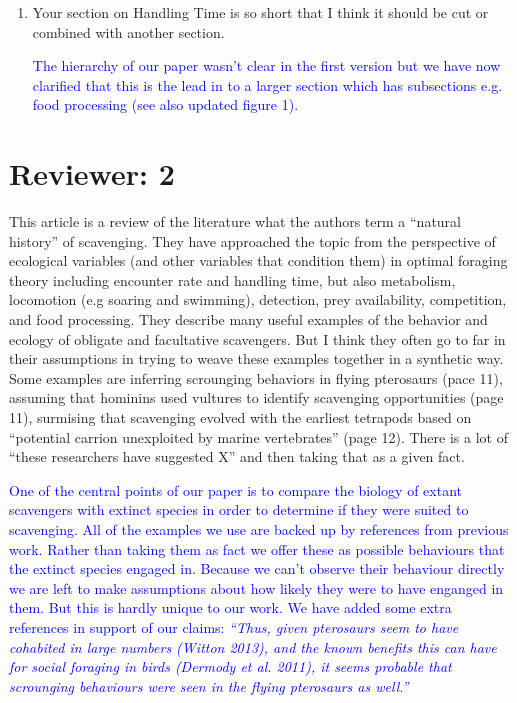 \documentclass[12pt,letterpaper]{article}
\begin{document}
\begin{enumerate}
\item{Your section on Handling Time is so short that I think it should be cut or combined with another section.}

\textcolor{blue}{The hierarchy of our paper wasn't clear in the first version but we have now clarified that this is the lead in to a larger section which has subsections e.g. food processing (see also updated figure 1).} 

\end{enumerate}

\section{Reviewer: 2}
This article is a review of the literature what the authors term a ``natural history'' of scavenging.
They have approached the topic from the perspective of ecological variables (and other variables that condition them) in optimal foraging theory including encounter rate and handling time, but also metabolism, locomotion (e.g soaring and swimming), detection, prey availability, competition, and food processing.
They describe many useful examples of the behavior and ecology of obligate and facultative scavengers.
But I think they often go to far in their assumptions in trying to weave these examples together in a synthetic way.
Some examples are inferring scrounging behaviors in flying pterosaurs (pace 11), assuming that hominins used vultures to identify scavenging opportunities (page 11), surmising that scavenging evolved with the earliest tetrapods based on ``potential carrion unexploited by marine vertebrates'' (page 12).
There is a lot of ``these researchers have suggested X'' and then taking that as a given fact.

\smallskip
\textcolor{blue}{One of the central points of our paper is to compare the biology of extant scavengers with extinct species in order to determine if they were suited to scavenging.
All of the examples we use are backed up by references from previous work.
Rather than taking them as fact we offer these as possible behaviours that the extinct species engaged in.
Because we can't observe their behaviour directly we are left to make assumptions about how likely they were to have enganged in them.
But this is hardly unique to our work.
We have added some extra references in support of our claims: \textit {``Thus, given pterosaurs seem to have cohabited in large numbers (Witton 2013), and the known benefits this can have for social foraging in birds (Dermody et al. 2011), it seems probable that scrounging behaviours were seen in the flying pterosaurs as well.''}}
\smallskip
\end{document}

